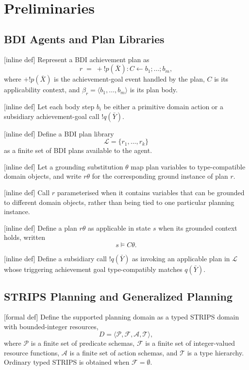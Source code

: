 \section{Preliminaries}

\subsection{BDI Agents and Plan Libraries}

[inline def] Represent a BDI achievement plan as
\[
r \;=\; +!p(\bar X):C \leftarrow b_1;\ldots;b_m,
\]
where \(+!p(\bar X)\) is the achievement-goal event handled by the plan,
\(C\) is its applicability context, and
\(\beta_r=\langle b_1,\ldots,b_m\rangle\) is its plan body.

[inline def] Let each body step \(b_i\) be either a primitive domain action
or a subsidiary achievement-goal call \( !q(\bar Y) \).

[inline def] Define a BDI plan library
\[
\mathcal L=\{r_1,\ldots,r_k\}
\]
as a finite set of BDI plans available to the agent.

[inline def] Let a grounding substitution \(\theta\) map plan variables to
type-compatible domain objects, and write \(r\theta\) for the corresponding
ground instance of plan \(r\).

[inline def] Call \(r\) parameterised when it contains variables that can be
grounded to different domain objects, rather than being tied to one particular
planning instance.

[inline def] Define a plan \(r\theta\) as applicable in state \(s\) when its
grounded context holds, written
\[
s \models C\theta.
\]

[inline def] Define a subsidiary call \( !q(\bar Y) \) as invoking an
applicable plan in \(\mathcal L\) whose triggering achievement goal
type-compatibly matches \(q(\bar Y)\).


\subsection{STRIPS Planning and Generalized Planning}

[formal def] Define the supported planning domain as a typed STRIPS domain
with bounded-integer resources,
\[
D=\langle \mathcal P,\mathcal F,\mathcal A,\mathcal T\rangle,
\]
where \(\mathcal P\) is a finite set of predicate schemas,
\(\mathcal F\) is a finite set of integer-valued resource functions,
\(\mathcal A\) is a finite set of action schemas, and
\(\mathcal T\) is a type hierarchy.
Ordinary typed STRIPS is obtained when \(\mathcal F=\emptyset\).


